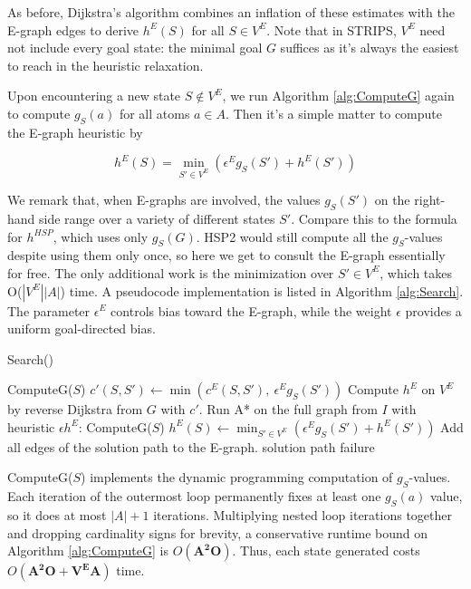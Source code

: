 \documentclass[letterpaper]{article}
\begin{document}
As before, Dijkstra's algorithm combines an inflation of these estimates with the E-graph edges to derive $h^E(S)$ for all $S\in V^E$. Note that in STRIPS, $V^E$ need not include every goal state: the minimal goal $G$ suffices as it's always the easiest to reach in the heuristic relaxation.

Upon encountering a new state $S\notin V^E$, we run Algorithm \ref{alg:ComputeG} again to compute $g_S(a)$ for all atoms $a\in A$. Then it's a simple matter to compute the E-graph heuristic by

\[h^E(S) = \min_{S'\in V^E} \left( \epsilon^E g_S(S') + h^E(S') \right)\]

We remark that, when E-graphs are involved, the values $g_S(S')$ on the right-hand side range over a variety of different states $S'$. Compare this to the formula for $h^{HSP}$, which uses only $g_S(G)$. HSP2 would still compute all the $g_S$-values despite using them only once, so here we get to consult the E-graph essentially for free. The only additional work is the minimization over $S'\in V^E$, which takes O($|V^E||A|$) time. A pseudocode implementation is listed in Algorithm \ref{alg:Search}. The parameter $\epsilon^E$ controls bias toward the E-graph, while the weight $\epsilon$ provides a uniform goal-directed bias.

\begin{algorithm}
\caption{Search()}
\label{alg:Search}
\begin{algorithmic}
\STATE ComputeG($S$)
\STATE $c'(S,S') \leftarrow \min\left(c^E(S,S'),~\epsilon^E g_S(S')\right)$
\ENDFOR
\ENDFOR
\STATE Compute $h^E$ on $V^E$ by reverse Dijkstra from $G$ with $c'$.
\STATE Run A* on the full graph from $I$ with heuristic $\epsilon h^E$:
\STATE ComputeG($S$)
\STATE $h^E(S) \leftarrow \min_{S'\in V^E} \left( \epsilon^E g_S(S') + h^E(S') \right)$
\ENDFOR
{}
\STATE Add all edges of the solution path to the E-graph.
\RETURN solution path
\ELSE
\RETURN failure
\ENDIF
\end{algorithmic}
\end{algorithm}

ComputeG($S$) implements the dynamic programming computation of $g_S$-values.
Each iteration of the outermost loop permanently fixes at least one $g_S(a)$ value, so it does at most $|A|+1$ iterations.
Multiplying nested loop iterations together and dropping cardinality signs for brevity, a conservative runtime bound on Algorithm \ref{alg:ComputeG} is $O(\mathbf{A^2O})$.
Thus, each state generated costs $O(\mathbf{A^2O + V^EA})$ time.
\end{document}
